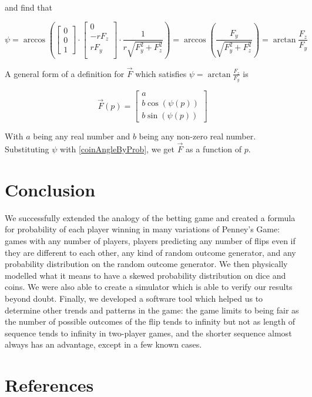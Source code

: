 \documentclass[english,12pt,a4paper,final]{article}
\begin{document}
and find that

\begin{equation*}
	\psi = \arccos \left(\begin{bmatrix}0\\0\\1\end{bmatrix} \cdot \begin{bmatrix}0\\-r F_z\\r F_y\\\end{bmatrix} \cdot \frac{1}{r\sqrt{F_y^2+F_z^2}} \right) = \arccos \left(\frac{F_y}{\sqrt{F_y^2+F_z^2}}\right) = \arctan\frac{F_z}{F_y}
\end{equation*}

A general form of a definition for $\vec{F}$ which satisfies $\psi = \arctan\frac{F_z}{F_y}$ is

\begin{equation*}
	\vec{F}(p) = \begin{bmatrix}a\\b\cos\left(\psi(p)\right)\\b\sin\left(\psi(p)\right)\end{bmatrix}
\end{equation*}

With $a$ being any real number and $b$ being any non-zero real number. Substituting $\psi$ with \eqref{coinAngleByProb}, we get $\vec{F}$ as a function of $p$.

\part {Conclusion}

We successfully extended the analogy of the betting game and created a formula for probability of each player winning in many variations of Penney's Game: games with any number of players, players predicting any number of flips even if they are different to each other, any kind of random outcome generator, and any probability distribution on the random outcome generator. We then physically modelled what it means to have a skewed probability distribution on dice and coins. We were also able to create a simulator which is able to verify our results beyond doubt. Finally, we developed a software tool which helped us to determine other trends and patterns in the game: the game limits to being fair as the number of possible outcomes of the flip tends to infinity but not as length of sequence tends to infinity in two-player games, and the shorter sequence almost always has an advantage, except in a few known cases.

\part {References}
\printbibliography[heading=none]
\end{document}

